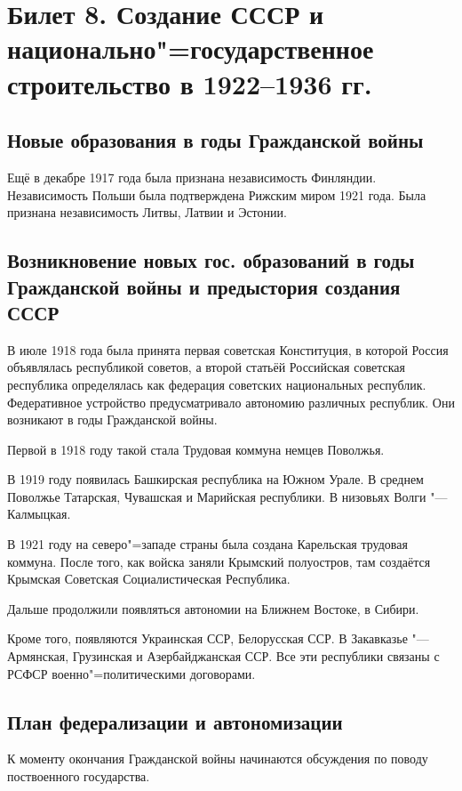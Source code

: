 \section{Билет 8. Создание СССР и национально"=государственное строительство в 1922--1936 гг.}

\subsection{Новые образования в годы Гражданской войны}

Ещё в декабре 1917 года была признана независимость Финляндии. Независимость Польши была подтверждена Рижским миром 1921 года. Была признана независимость Литвы, Латвии и Эстонии.

\subsection{Возникновение новых гос. образований в годы Гражданской войны и предыстория создания СССР}

В июле 1918 года была принята первая советская Конституция, в которой Россия объявлялась республикой советов, а второй статьёй Российская советская республика определялась как федерация советских национальных республик. Федеративное устройство предусматривало автономию различных республик. Они возникают в годы Гражданской войны.

Первой в 1918 году такой стала Трудовая коммуна немцев Поволжья.

В 1919 году появилась Башкирская республика на Южном Урале. В среднем Поволжье Татарская, Чувашская и Марийская республики. В низовьях Волги "--- Калмыцкая.

В 1921 году на северо"=западе страны была создана Карельская трудовая коммуна. После того, как войска заняли Крымский полуостров, там создаётся Крымская Советская Социалистическая Республика. 

Дальше продолжили появляться автономии на Ближнем Востоке, в Сибири.

Кроме того, появляются Украинская ССР, Белорусская ССР. В Закавказье "--- Армянская, Грузинская и Азербайджанская ССР. Все эти республики связаны с РСФСР военно"=политическими договорами.

\subsection{План федерализации и автономизации}

К моменту окончания Гражданской войны начинаются обсуждения по поводу поствоенного государства. 

